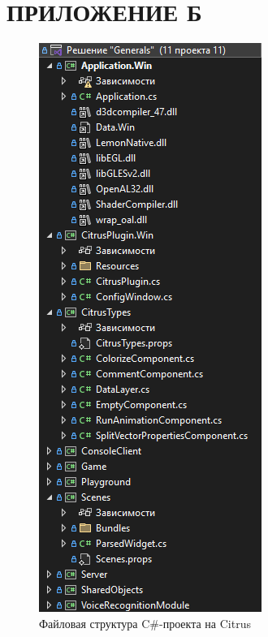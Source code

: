 \section*{ПРИЛОЖЕНИЕ Б}
\begin{figure}[H]
    \centering
    \caption{Файловая структура C\#-проекта на Citrus}\label{app2}
    \includegraphics[height=0.85\textheight]{pictures/citrus_fs.png}
\end{figure}
\pagebreak

